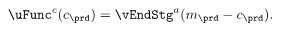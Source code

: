   \begin{equation}\begin{gathered}\begin{aligned}
        \uFunc^{{c}}({c}_{\prd})   & = \vEndStg^{{a}}({m}_{\prd}-{c}_{\prd}).
        \label{eq:upEqbetaOp}
      \end{aligned}\end{gathered}\end{equation}
